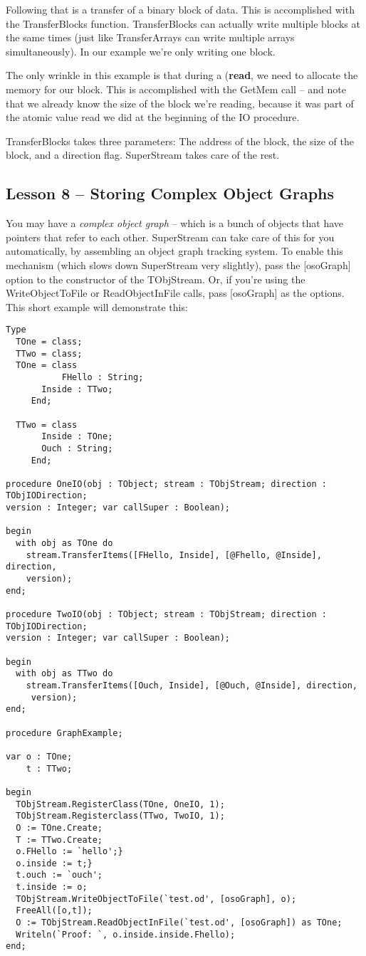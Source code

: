 \documentclass{report}
\begin{document}
Following that is a transfer of a binary block of data. This is accomplished
with the TransferBlocks function. TransferBlocks can actually write multiple
blocks at the same times (just like TransferArrays can write multiple arrays
simultaneously).  In our example we're only writing one block.

The only wrinkle in this example is that during a (\textbf{read}, we need to
allocate the memory for our block. This is accomplished with the GetMem call
-- and note that we already know the size of the block we're reading,
because it was part of the atomic value read we did at the beginning of the
IO procedure.

TransferBlocks takes three parameters: The address of the block, the size of
the block, and a direction flag. SuperStream takes care of the rest.

\subsection{Lesson 8 -- Storing Complex Object Graphs}

You may have a \emph{complex object graph } -- which is a bunch of objects
that have pointers that refer to each other. SuperStream can take care of
this for you automatically, by assembling an object graph tracking system.
To enable this mechanism (which slows down SuperStream very slightly), pass
the [osoGraph] option to the constructor of the TObjStream. Or, if you're
using the WriteObjectToFile or ReadObjectInFile calls, pass [osoGraph] as
the options. This short example will demonstrate this:

\begin{lstlisting}
Type
  TOne = class;
  TTwo = class;
  TOne = class
           FHello : String;
	   Inside : TTwo;
	 End;

  TTwo = class
 	   Inside : TOne;
	   Ouch : String;
	 End;

procedure OneIO(obj : TObject; stream : TObjStream; direction : TObjIODirection;
version : Integer; var callSuper : Boolean);

begin
  with obj as TOne do
    stream.TransferItems([FHello, Inside], [@Fhello, @Inside], direction, 
    version);
end;

procedure TwoIO(obj : TObject; stream : TObjStream; direction : TObjIODirection;
version : Integer; var callSuper : Boolean);

begin
  with obj as TTwo do
    stream.TransferItems([Ouch, Inside], [@Ouch, @Inside], direction, 
     version);
end;

procedure GraphExample;

var o : TOne;
    t : TTwo;

begin
  TObjStream.RegisterClass(TOne, OneIO, 1);
  TObjStream.Registerclass(TTwo, TwoIO, 1);
  O := TOne.Create;
  T := TTwo.Create;
  o.FHello := `hello';}
  o.inside := t;}
  t.ouch := `ouch';
  t.inside := o;
  TObjStream.WriteObjectToFile(`test.od', [osoGraph], o);
  FreeAll([o,t]);
  O := TObjStream.ReadObjectInFile(`test.od', [osoGraph]) as TOne;
  Writeln(`Proof: `, o.inside.inside.Fhello);
end;
\end{lstlisting}
\end{document}

